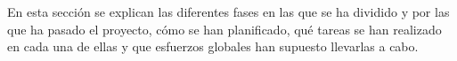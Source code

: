En esta sección se explican las diferentes fases en las que se ha dividido y por las que ha pasado el proyecto, cómo se han planificado, qué tareas se han realizado en cada una de ellas y que esfuerzos globales han supuesto llevarlas a cabo.